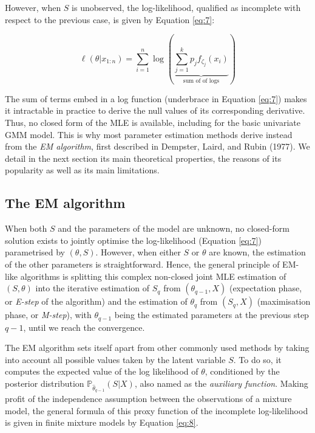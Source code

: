 However, when \(S\) is unobserved, the log-likelihood, qualified as
incomplete with respect to the previous case, is given by Equation
\eqref{eq:7}:

\begin{equation}
\ell (\theta \vert x_{1:n}) = \sum_{i=1}^n  \log \left( \underbrace{\sum_{j=1}^k  p_j f_{\zeta_j}(x_i)}_{\text{sum of of logs}} \right)
\label{eq:7}
\end{equation}

The sum of terms embed in a log function (underbrace in Equation \eqref{eq:7}) makes it intractable in practice to derive the null values of its
corresponding derivative. Thus, no closed form of the MLE is available,
including for the basic univariate GMM model. This is why most
parameter estimation methods derive instead from the \emph{EM algorithm},
first described in Dempster, Laird, and Rubin (1977). We detail in the next section its
main theoretical properties, the reasons of its popularity as well as
its main limitations.

\hypertarget{the-em-algorithm}{%
\subsection{The EM algorithm}\label{the-em-algorithm}}

When both \(S\) and the parameters of the model are unknown, no closed-form solution exists to jointly optimise the log-likelihood (Equation \eqref{eq:7}) parametrised by \(({\theta}, S)\).
However, when either \(S\) or \(\theta\) are known, the estimation of the
other parameters is straightforward. Hence, the general principle of
EM-like algorithms is splitting this complex non-closed joint MLE
estimation of \((S, \theta)\) into the iterative estimation of \(S_q\) from
\((\theta_{q-1}, X)\) (expectation phase, or \emph{E-step} of the algorithm)
and the estimation of \(\theta_q\) from \((S_q, X)\) (maximisation phase, or
\emph{M-step}), with \(\theta_{q-1}\) being the estimated parameters at the
previous step \(q-1\), until we reach the convergence.

The EM algorithm sets itself apart from other commonly used methods by taking
into account all possible values taken by the latent variable \(S\). To do
so, it computes the expected value of the log likelihood of \(\theta\),
conditioned by the posterior distribution
\(\mathbb{P}_{\hat{\theta}_{q-1}} (S|X)\), also named as the \emph{auxiliary
function}. Making profit of the independence assumption between the
observations of a mixture model, the general formula of this proxy
function of the incomplete log-likelihood is given in finite mixture
models by Equation \eqref{eq:8}.

